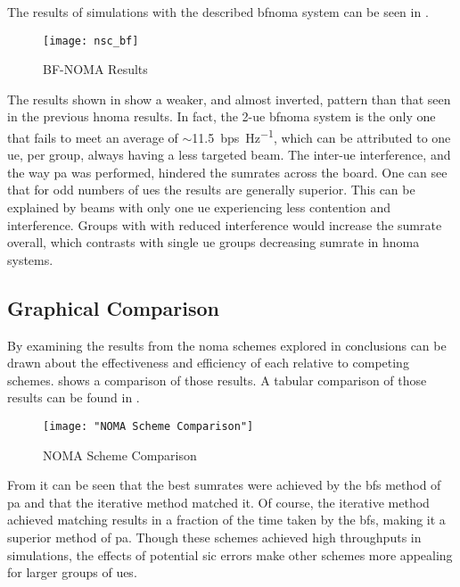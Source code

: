 \par
The results of simulations with the described \ac{bfnoma} system can be seen in .

\begin{figure}[H]
	\centering
	\texttt{[image: nsc\_bf]}
	\caption{BF-NOMA Results}
	\label{fig:nsc_bf}
\end{figure}

\par
The results shown in  show a weaker, and almost inverted, pattern than that seen in the previous \ac{hnoma} results.
In fact, the 2-\ac{ue} \ac{bfnoma} system is the only one that fails to meet an average of $\sim$\SI{11.5}{bps\per\hertz}, which can be attributed to one \ac{ue}, per group, always having a less targeted beam.
The inter-\ac{ue} interference, and the way \ac{pa} was performed, hindered the sumrates across the board.
One can see that for odd numbers of \acp{ue} the results are generally superior.
This can be explained by beams with only one \ac{ue} experiencing less contention and interference.
Groups with with reduced interference would increase the sumrate overall, which contrasts with single \ac{ue} groups decreasing sumrate in \ac{hnoma} systems.

\subsection{Graphical Comparison}
\label{sec:graphcomp}
By examining the results from the \ac{noma} schemes explored in  conclusions can be drawn about the effectiveness and efficiency of each relative to competing schemes.
 shows a comparison of those results.
A tabular comparison of those results can be found in .

\begin{figure}[H]
	\centering
	\texttt{[image: "NOMA Scheme Comparison"]}
	\caption{NOMA Scheme Comparison}
	\label{fig:nsc}
\end{figure}

\par
From  it can be seen that the best sumrates were achieved by the \ac{bfs} method of \ac{pa} and that the iterative method matched it.
Of course, the iterative method achieved matching results in a fraction of the time taken by the \ac{bfs}, making it a superior method of \ac{pa}.
Though these schemes achieved high throughputs in simulations, the effects of potential \ac{sic} errors make other schemes more appealing for larger groups of \acp{ue}.

